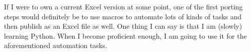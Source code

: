 If I were to own a current Excel version at some point, one of the first porting steps would definitely be to use macros to automate lots of kinds of tasks and then publish \tfn as an Excel file as well.
One thing I can say is that I am (slowly) learning Python.
When I become proficient enough, I am going to use it for the aforementioned automation tasks.

